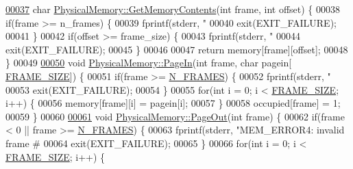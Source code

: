 \begin{DoxyCode}
\hypertarget{memory_8cpp_source.tex_l00037}{}\hyperlink{classPhysicalMemory_a2d6b5c45f2377838a76e58b2c083610a}{00037} \textcolor{keywordtype}{char} \hyperlink{classPhysicalMemory_a2d6b5c45f2377838a76e58b2c083610a}{PhysicalMemory::GetMemoryContents}(\textcolor{keywordtype}{int} frame, \textcolor{keywordtype}{int} offset) \{
00038     \textcolor{keywordflow}{if}(frame >= n\_frames) \{
00039         fprintf(stderr, \textcolor{stringliteral}{"%
00040         exit(EXIT\_FAILURE);
00041     \}
00042     \textcolor{keywordflow}{if}(offset >= frame\_size) \{
00043         fprintf(stderr, \textcolor{stringliteral}{"%
00044         exit(EXIT\_FAILURE);
00045     \}
00046 
00047     \textcolor{keywordflow}{return} memory[frame][offset];
00048 \}
00049 
\hypertarget{memory_8cpp_source.tex_l00050}{}\hyperlink{classPhysicalMemory_a70cb4ae5b23f04cb347ac93cc9fc1028}{00050} \textcolor{keywordtype}{void} \hyperlink{classPhysicalMemory_a70cb4ae5b23f04cb347ac93cc9fc1028}{PhysicalMemory::PageIn}(\textcolor{keywordtype}{int} frame, \textcolor{keywordtype}{char} pagein[
      \hyperlink{memory_8h_af9b1b2ba12857a4bf11289dac8c5462d}{FRAME\_SIZE}]) \{
00051     \textcolor{keywordflow}{if}(frame >= \hyperlink{memory_8h_a0b0ce802de0cae773522024d7626b007}{N\_FRAMES}) \{
00052         fprintf(stderr, \textcolor{stringliteral}{"%
00053         exit(EXIT\_FAILURE);
00054     \}
00055     \textcolor{keywordflow}{for}(\textcolor{keywordtype}{int} i = 0; i < \hyperlink{memory_8h_af9b1b2ba12857a4bf11289dac8c5462d}{FRAME\_SIZE}; i++) \{
00056         memory[frame][i] = pagein[i];
00057     \}
00058     occupied[frame] = 1;
00059 \}
00060 
\hypertarget{memory_8cpp_source.tex_l00061}{}\hyperlink{classPhysicalMemory_a6e1cf83f35ab25e879630783ebaecff3}{00061} \textcolor{keywordtype}{void} \hyperlink{classPhysicalMemory_a6e1cf83f35ab25e879630783ebaecff3}{PhysicalMemory::PageOut}(\textcolor{keywordtype}{int} frame) \{
00062     \textcolor{keywordflow}{if}(frame < 0 || frame >= \hyperlink{memory_8h_a0b0ce802de0cae773522024d7626b007}{N\_FRAMES}) \{
00063         fprintf(stderr, \textcolor{stringliteral}{"MEM\_ERROR4: invalid frame # %
00064         exit(EXIT\_FAILURE);
00065     \}
00066     \textcolor{keywordflow}{for}(\textcolor{keywordtype}{int} i = 0; i < \hyperlink{memory_8h_af9b1b2ba12857a4bf11289dac8c5462d}{FRAME\_SIZE}; i++) \{
}}}}
\end{DoxyCode}
